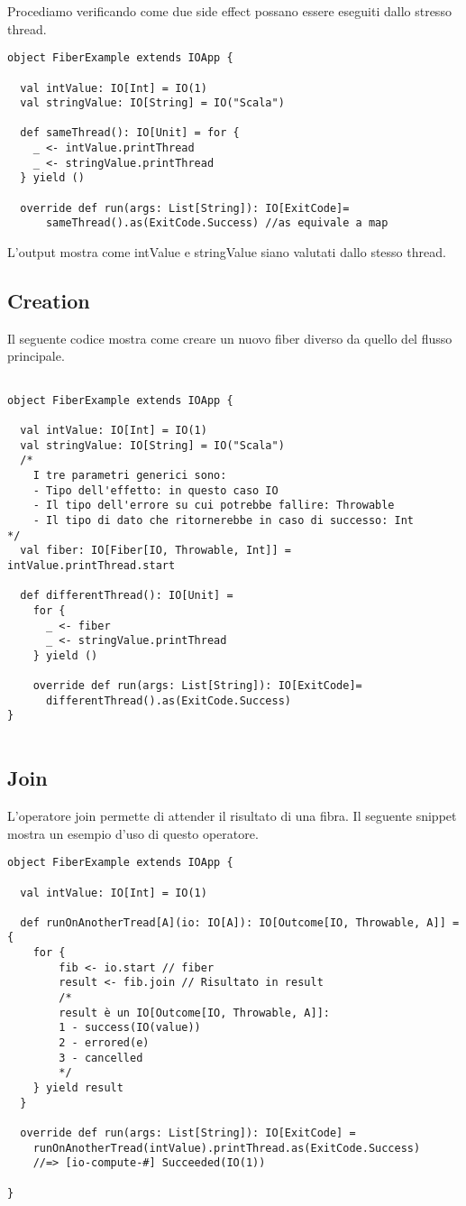 Procediamo verificando come due side effect possano essere eseguiti dallo stresso thread. 
\begin{verbatim}
object FiberExample extends IOApp {

  val intValue: IO[Int] = IO(1)
  val stringValue: IO[String] = IO("Scala")

  def sameThread(): IO[Unit] = for {
    _ <- intValue.printThread
    _ <- stringValue.printThread
  } yield ()

  override def run(args: List[String]): IO[ExitCode]=
      sameThread().as(ExitCode.Success) //as equivale a map
\end{verbatim}

L'output mostra come intValue e stringValue siano valutati dallo stesso thread.

\subsection{Creation}
Il seguente codice mostra come creare un nuovo fiber diverso da quello del flusso principale.

\begin{verbatim}

object FiberExample extends IOApp {

  val intValue: IO[Int] = IO(1)
  val stringValue: IO[String] = IO("Scala")
  /*
    I tre parametri generici sono:
    - Tipo dell'effetto: in questo caso IO
    - Il tipo dell'errore su cui potrebbe fallire: Throwable
    - Il tipo di dato che ritornerebbe in caso di successo: Int
*/
  val fiber: IO[Fiber[IO, Throwable, Int]] = intValue.printThread.start

  def differentThread(): IO[Unit] =
    for {
      _ <- fiber
      _ <- stringValue.printThread
    } yield ()

    override def run(args: List[String]): IO[ExitCode]=
      differentThread().as(ExitCode.Success) 
}
    
\end{verbatim}

\subsection{Join}
L'operatore join permette di attender il risultato di una fibra. Il seguente snippet mostra un esempio d'uso di questo operatore.

\begin{verbatim}
object FiberExample extends IOApp {

  val intValue: IO[Int] = IO(1)
  
  def runOnAnotherTread[A](io: IO[A]): IO[Outcome[IO, Throwable, A]] = {
    for {
        fib <- io.start // fiber
        result <- fib.join // Risultato in result
        /*
        result è un IO[Outcome[IO, Throwable, A]]:
        1 - success(IO(value))
        2 - errored(e)
        3 - cancelled
        */
    } yield result
  }

  override def run(args: List[String]): IO[ExitCode] = 
    runOnAnotherTread(intValue).printThread.as(ExitCode.Success) 
    //=> [io-compute-#] Succeeded(IO(1))
    
}
\end{verbatim}

